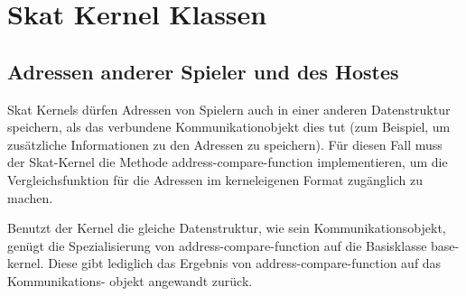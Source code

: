 \section{Skat Kernel Klassen}

\subsection{Adressen anderer Spieler und des Hostes}
Skat Kernels dürfen Adressen von Spielern auch in einer anderen Datenstruktur speichern,
als das verbundene Kommunikationobjekt dies tut (zum Beispiel, um zusätzliche Informationen
zu den Adressen zu speichern).
Für diesen Fall muss der Skat-Kernel die Methode address-compare-function implementieren,
um die Vergleichsfunktion für die Adressen im kerneleigenen Format zugänglich zu machen.

Benutzt der Kernel die gleiche Datenstruktur, wie sein Kommunikationsobjekt,
genügt die Spezialisierung von address-compare-function auf die Basisklasse base-kernel.
Diese gibt lediglich das Ergebnis von address-compare-function auf das Kommunikations-
objekt angewandt zurück.